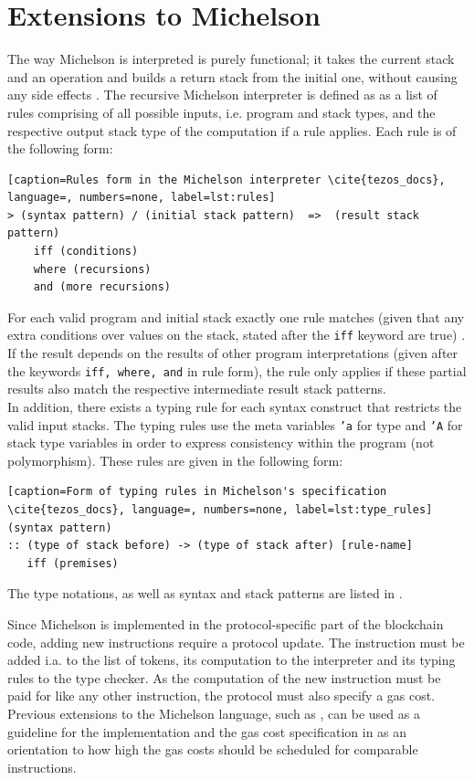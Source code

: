 \section{Extensions to Michelson}
The way Michelson is interpreted is purely functional; it takes the current stack and an operation and builds a return stack from the initial one, without causing any side effects \cite{tezos_docs}. The recursive Michelson interpreter is defined as as a list of rules comprising of all possible inputs, i.e. program and stack types, and the respective output stack type of the computation if a rule applies. Each rule is of the following form: 
\begin{lstlisting}[caption=Rules form in the Michelson interpreter \cite{tezos_docs}, language=, numbers=none, label=lst:rules]
> (syntax pattern) / (initial stack pattern)  =>  (result stack pattern)
    iff (conditions)
    where (recursions)
    and (more recursions)
\end{lstlisting}
For each valid program and initial stack exactly one rule matches (given that any extra conditions over values on the stack, stated after the \texttt{iff} keyword are true) \cite{tezos_docs}. If the result depends on the results of other program interpretations (given after the keywords \texttt{iff, where, and} in rule form), the rule only applies if these partial results also match the respective intermediate result stack patterns.\\
In addition, there exists a typing rule for each syntax construct that restricts the valid input stacks. The typing rules use the meta variables \texttt{'a} for type and \texttt{'A} for stack type variables in order to express consistency within the program (not polymorphism). These rules are given in the following form:
\begin{lstlisting}[caption=Form of typing rules in Michelson's specification \cite{tezos_docs}, language=, numbers=none, label=lst:type_rules]
(syntax pattern)
:: (type of stack before) -> (type of stack after) [rule-name]
   iff (premises)
\end{lstlisting}
The type notations, as well as syntax and stack patterns are listed in \cite{tezos_docs}.

Since Michelson is implemented in the protocol-specific part of the blockchain code, adding new instructions require a protocol update. The instruction must be added i.a. to the list of tokens, its computation to the interpreter and its typing rules to the type checker. As the computation of the new instruction must be paid for like any other instruction, the protocol must also specify a gas cost. Previous extensions to the Michelson language, such as \cite{tezos_michelson_ext}, can be used as a guideline for the implementation and the gas cost specification in \cite{tezos_repo_gas} as an orientation to how high the gas costs should be scheduled for comparable instructions.

